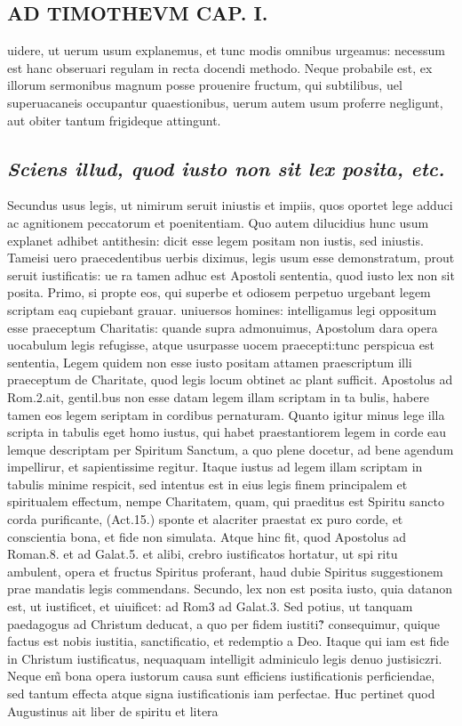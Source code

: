 \documentclass{article}
\begin{document}
\begin{pages}
\section*{AD TIMOTHEVM CAP. I. }
\marginpar{[ p.26 ]}\pstart uidere, ut uerum usum explanemus, et tunc modis omnibus urgeamus: necessum est hanc obseruari regulam in recta docendi methodo. Neque  probabile est, ex illorum sermonibus magnum posse prouenire fructum, qui subtilibus, uel superuacaneis occupantur quaestionibus, uerum autem usum proferre negligunt, aut obiter tantum frigideque  attingunt.  \pend
{}
{}
\subsection*{\textit{Sciens illud, quod iusto non sit lex posita, etc. }}\pstart Secundus usus legis, ut nimirum seruit iniustis et impiis, quos oportet lege adduci ac agnitionem peccatorum et poenitentiam. Quo autem dilucidius hunc usum explanet adhibet antithesin: dicit esse legem positam non iustis, sed iniustis. Tameisi uero praecedentibus uerbis diximus, legis usum esse demonstratum, prout seruit iustificatis: ue ra tamen adhuc est Apostoli sententia, quod iusto lex non sit posita. Primo, si propte eos, qui superbe et odiosem perpetuo urgebant legem scriptam eaq cupiebant grauar. uniuersos homines: intelligamus legi oppositum esse praeceptum Charitatis: quande supra admonuimus, Apostolum dara opera uocabulum legis refugisse, atque  usurpasse uocem praecepti:tunc perspicua est sententia, Legem quidem non esse iusto positam attamen praescriptum illi praeceptum de Charitate, quod legis locum obtinet ac plant sufficit. Apostolus ad Rom.2.ait, gentil.bus non esse datam legem illam scriptam in ta bulis, habere tamen eos legem seriptam in cordibus pernaturam. Quanto igitur minus lege illa scripta in tabulis eget homo iustus, qui habet praestantiorem legem in corde eau lemque  descriptam per Spiritum Sanctum, a quo plene docetur, ad bene agendum impellirur, et sapientissime regitur. Itaque  iustus ad legem illam scriptam in tabulis minime respicit, sed intentus est in eius legis finem principalem et spiritualem effectum, nempe Charitatem, quam, qui praeditus est Spiritu sancto corda purificante, (Act.15.) sponte et alacriter praestat ex puro corde, et conscientia bona, et fide non simulata. Atque  hinc fit, quod Apostolus ad Roman.8. et ad Galat.5. et alibi, crebro iustificatos hortatur, ut spi ritu ambulent, opera et fructus Spiritus proferant, haud dubie Spiritus suggestionem prae mandatis legis commendans.  \pend\pstart Secundo, lex non est posita iusto, quia datanon est, ut iustificet, et uiuificet: ad Rom3 ad Galat.3. Sed potius, ut tanquam paedagogus ad Christum deducat, a quo per fidem iustiti?̃ consequimur, quique  factus est nobis iustitia, sanctificatio, et redemptio a Deo. Itaque  qui iam est fide in Christum iustificatus, nequaquam intelligit adminiculo legis denuo justisiczri. Neque  em̃ bona opera iustorum causa sunt efficiens iustificationis perficiendae, sed tantum effecta atque  signa iustificationis iam perfectae. Huc pertinet quod Augustinus ait liber  de spiritu et litera 
\end{pages}
\end{document}
